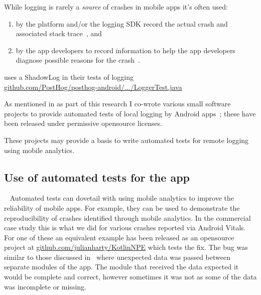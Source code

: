 \begin{kaobox}[frametitle=Automated tests for logging]
While logging is rarely a \emph{source} of crashes in mobile apps it's often used: 
\begin{enumerate}[label=(\alph*)]
    \item  by the platform and/or the logging SDK record the actual crash and associated stack trace~, and
    \item by the app developers to record information to help the app developers diagnose possible reasons for the crash~.
\end{enumerate}

 uses a ShadowLog in their tests of logging \\ \href{https://github.com/PostHog/posthog-android/blob/master/posthog/src/test/java/com/posthog/android/LoggerTest.java}{github.com/PostHog/posthog-android/.../LoggerTest.java}

\medskip %

As mentioned in  as part of this research I co-wrote various small software projects to provide automated tests of local logging by Android apps~; these have been released under permissive opensource licenses.

\medskip %

These projects may provide a basis to write automated tests for remote logging using mobile analytics.
\end{kaobox}


\subsection{Use of automated tests for the app}~\label{aata-use-of-automated-tests-for-the-app-topic}
Automated tests can dovetail with using mobile analytics to improve the reliability of mobile apps. For example, they can be used to demonstrate the reproducibility of crashes identified through mobile analytics. In the commercial case study this is what we did for various crashes reported via Android Vitals. For one of these an equivalent example has been released as an opensource project at  \href{https://github.com/julianharty/KotlinNPE}{github.com/julianharty/KotlinNPE} which tests the fix. The bug was similar to those discussed in~ where unexpected data was passed between separate modules of the app. The module that received the data expected it would be complete and correct, however sometimes it was not as some of the data was incomplete or missing.

